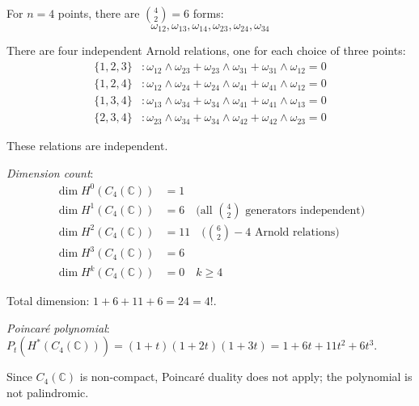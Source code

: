 \begin{example}[\texorpdfstring{$n=4$}{n=4}: multiple relations]
\label{ex:arnold-n4-complete}

For $n=4$ points, there are $\binom{4}{2} = 6$ forms:
\begin{equation}
\omega_{12}, \omega_{13}, \omega_{14}, \omega_{23}, \omega_{24}, \omega_{34}
\end{equation}

There are four independent Arnold relations, one for each choice of three points:
\begin{align}
\{1,2,3\}&: \omega_{12} \wedge \omega_{23} + \omega_{23} \wedge \omega_{31} + 
\omega_{31} \wedge \omega_{12} = 0\\
\{1,2,4\}&: \omega_{12} \wedge \omega_{24} + \omega_{24} \wedge \omega_{41} + 
\omega_{41} \wedge \omega_{12} = 0\\
\{1,3,4\}&: \omega_{13} \wedge \omega_{34} + \omega_{34} \wedge \omega_{41} + 
\omega_{41} \wedge \omega_{13} = 0\\
\{2,3,4\}&: \omega_{23} \wedge \omega_{34} + \omega_{34} \wedge \omega_{42} + 
\omega_{42} \wedge \omega_{23} = 0
\end{align}

These relations are independent.

\emph{Dimension count}:
\begin{align}
\dim H^0(C_4(\mathbb{C})) &= 1\\
\dim H^1(C_4(\mathbb{C})) &= 6 \quad \text{(all $\binom{4}{2}$ generators independent)}\\
\dim H^2(C_4(\mathbb{C})) &= 11 \quad \text{($\binom{6}{2} - 4$ Arnold relations)}\\
\dim H^3(C_4(\mathbb{C})) &= 6\\
\dim H^k(C_4(\mathbb{C})) &= 0 \quad k \geq 4
\end{align}

Total dimension: $1 + 6 + 11 + 6 = 24 = 4!$.

\emph{Poincaré polynomial}: $P_t(H^*(C_4(\mathbb{C}))) = (1+t)(1+2t)(1+3t) = 1 + 6t + 11t^2 + 6t^3$.

Since $C_4(\mathbb{C})$ is non-compact, Poincar\'{e} duality does not apply; the polynomial is not palindromic.
\end{example}

